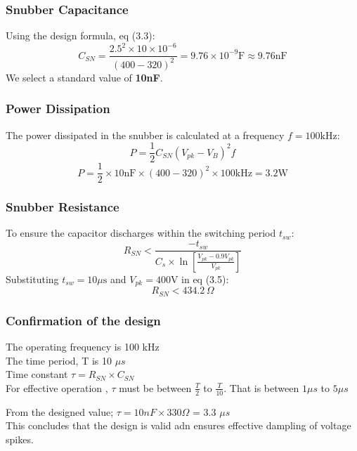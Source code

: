 \subsubsection{Snubber Capacitance}
Using the design formula, eq (3.3):
\[ C_{SN} = \frac{2.5^2 \times 10 \times 10^{-6}}{(400 - 320)^2} = 9.76 \times 10^{-9} \text{F} \approx 9.76\text{nF} \]
We select a standard value of \textbf{10nF}.

\subsubsection{Power Dissipation}
The power dissipated in the snubber is calculated at a frequency $f = 100\text{kHz}$:
\begin{equation}
     P = \frac{1}{2} C_{SN} (V_{pk} - V_B)^2 f 
\end{equation}
\[ P = \frac{1}{2} \times 10\text{nF} \times (400 - 320)^2 \times 100\text{kHz} = 3.2\text{W} \]

\subsubsection{Snubber Resistance}
To ensure the capacitor discharges within the switching period $t_{sw}$:
\begin{equation}
    R_{SN} < \frac{-t_{sw}}{C_s \times \ln \left[ \frac{V_{pk} - 0.9V_{pk}}{V_{pk}} \right]}
\end{equation}  
Substituting $t_{sw} = 10\mu\text{s}$ and $V_{pk} = 400\text{V} $ in eq (3.5):
\[ R_{SN} < 434.2 \, \Omega \]

\subsubsection{Confirmation of the design}
 The operating frequency is 100 kHz
\\ The time period, T is 10 $\mu s$
\\Time constant $\tau = {R_{SN} \times C_{SN}}$
 \\ For effective operation , $\tau$ must be between $\frac{T}{2}$ to $\frac{T}{10}$. That is between $1 \mu s$ to $5 \mu s$
\vspace{10pt}

From the designed value; $\tau = {10n F}\times {330\Omega}$ = 3.3 $\mu s$
\\This concludes that the design is valid adn ensures effective dampling of voltage spikes.

\vspace{10pt}

